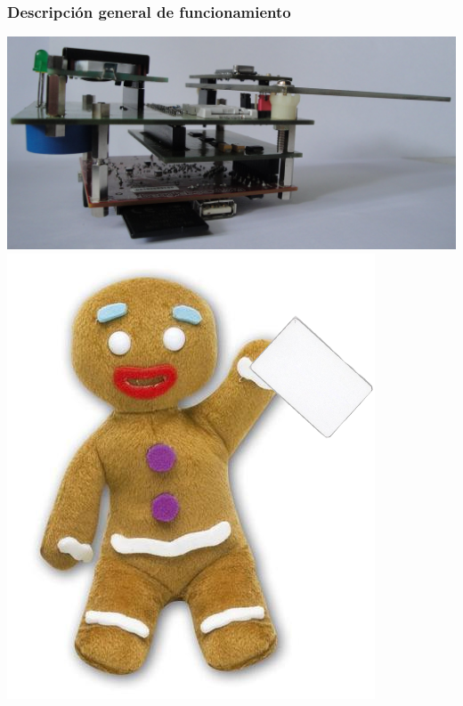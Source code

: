 \documentclass{beamer}
\begin{document}

\begin{frame}
	\frametitle{Descripción general de funcionamiento}
	\begin{center}
		\includegraphics[scale=.08]{Imagenes/prototipo_s.jpg}
		\includegraphics[scale=.35]{Imagenes/pinpon_tarj.png}
	\end{center}
\end{frame}	
\end{document}
